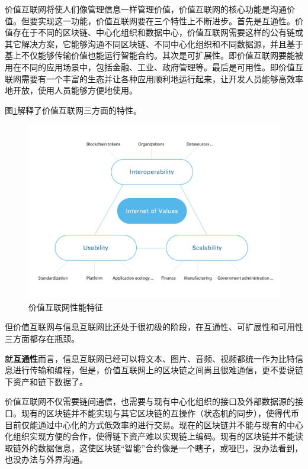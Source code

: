 \documentclass[a4paper,12pt]{article}
\begin{document}
价值互联网将使人们像管理信息一样管理价值，价值互联网的核心功能是沟通价值。但要实现这一功能，价值互联网要在三个特性上不断进步。首先是互通性。价值存在于不同的区块链、中心化组织和数据中心，价值互联网需要这样的公有链或其它解决方案，它能够沟通不同区块链、不同中心化组织和不同数据源，并且基于基上不仅能够传输价值也能运行智能合约。其次是可扩展性。即价值互联网要能被用在不同的应用场景中，包括金融、工业、政府管理等。最后是可用性。即价值互联网需要有一个丰富的生态并让各种应用顺利地运行起来，让开发人员能够高效率地开放，使用人员能够方便地使用。

图\ref{fig:Characteristics-of-IoV}解释了价值互联网三方面的特性。

\renewcommand\figurename{图}

\begin{figure} [htbp]
\centering \includegraphics [width = 5in]{pic/Characteristics-of-IoV.png}
\caption{价值互联网性能特征} \label{fig:Characteristics-of-IoV}
\end{figure}


但价值互联网与信息互联网比还处于很初级的阶段，在互通性、可扩展性和可用性三方面都存在瓶颈。

就\textbf{互通性}而言，信息互联网已经可以将文本、图片、音频、视频都统一作为比特信息进行传输和编程，但是，价值互联网上的区块链之间尚且很难通信，更不要说链下资产和链下数据了。

价值互联网不仅需要链间通信，也需要与现有中心化组织的接口及外部数据源的接口。现有的区块链并不能实现与其它区块链的互操作（状态机的同步），使得代币目前仅能通过中心化的方式低效率的进行交易。现在的区块链并不能与现有的中心化组织实现方便的合作，使得链下资产难以实现链上编码。现有的区块链并不能读取链外的数据信息，这使区块链“智能”合约像是一个瞎子，或哑巴，没办法看到，也没办法与外界沟通。
\end{document}
